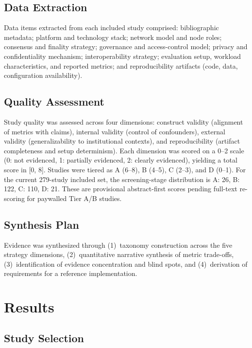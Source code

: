 \documentclass[journal]{IEEEtran}
\begin{document}
\subsection{Data Extraction}

Data items extracted from each included study comprised: bibliographic metadata; platform and technology stack; network model and node roles; consensus and finality strategy; governance and access-control model; privacy and confidentiality mechanism; interoperability strategy; evaluation setup, workload characteristics, and reported metrics; and reproducibility artifacts (code, data, configuration availability).

\subsection{Quality Assessment}

Study quality was assessed across four dimensions: construct validity (alignment of metrics with claims), internal validity (control of confounders), external validity (generalizability to institutional contexts), and reproducibility (artifact completeness and setup determinism).
Each dimension was scored on a 0--2 scale (0: not evidenced, 1: partially evidenced, 2: clearly evidenced), yielding a total score in [0, 8].
Studies were tiered as A (6--8), B (4--5), C (2--3), and D (0--1).
For the current 279-study included set, the screening-stage distribution is A: 26, B: 122, C: 110, D: 21.
These are provisional abstract-first scores pending full-text re-scoring for paywalled Tier A/B studies.

\subsection{Synthesis Plan}

Evidence was synthesized through (1)~taxonomy construction across the five strategy dimensions, (2)~quantitative narrative synthesis of metric trade-offs, (3)~identification of evidence concentration and blind spots, and (4)~derivation of requirements for a reference implementation.

\section{Results}
\label{sec:results}

\subsection{Study Selection}
\end{document}
